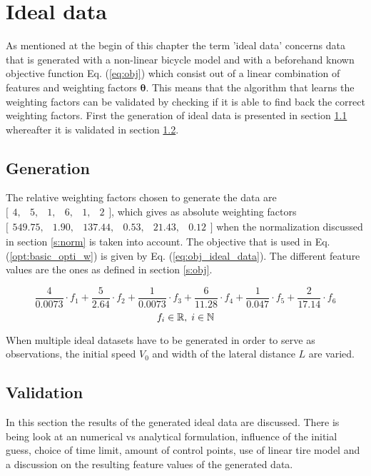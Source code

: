 \section{Ideal data} \label{s:GD}
As mentioned at the begin of this chapter the term 'ideal data' concerns data that is generated with a non-linear bicycle model and with a beforehand known objective function Eq. (\ref{eq:obj}) which consist out of a linear combination of features and weighting factors $\bm{\theta}$. This means that the algorithm that learns the weighting factors can be validated by checking if it is able to find back the correct weighting factors. First the generation of ideal data is presented in section \ref{s:generation} whereafter it is validated in section \ref{s:GD_val}.

\subsection{Generation}
\label{s:generation}
The relative weighting factors chosen to generate the data are $ \bigl[ \begin{smallmatrix} 4,&5,&1,&6,&1,&2\end{smallmatrix}\bigr]$, which gives as absolute weighting factors  $ \bigl[ \begin{smallmatrix} 549.75, &1.90, &137.44  ,&0.53,  &21.43, &0.12\end{smallmatrix}\bigr]$ when the normalization discussed in section \ref{s:norm} is taken into account. The objective that is used in Eq. (\ref{opt:basic_opti_w}) is given by Eq. (\ref{eq:obj_ideal_data}). The different feature values are the ones as defined in section \ref{s:obj}.

\begin{equation}\label{eq:obj_ideal_data}
\frac{4}{0.0073} \cdot f_1 +\frac{5}{2.64} \cdot f_2 +\frac{1}{0.0073} \cdot f_3 +\frac{6}{11.28} \cdot f_4 +\frac{1}{0.047} \cdot f_5 +\frac{2}{17.14} \cdot f_6 
\end{equation}
\[	f_i \in \mathbb{R}, \hspace{1mm}
i \in \mathbb{N}\]

 When multiple ideal datasets have to be generated in order to serve as observations, the initial speed $V_{0}$ and width of the lateral distance $L$ are varied.

\subsection{Validation} \label{s:GD_val}
In this section the results of the generated ideal data are discussed. There is being look at an numerical vs analytical formulation, influence of the initial guess, choice of time limit, amount of control points, use of linear tire model and a discussion on the resulting feature values of the generated data.

